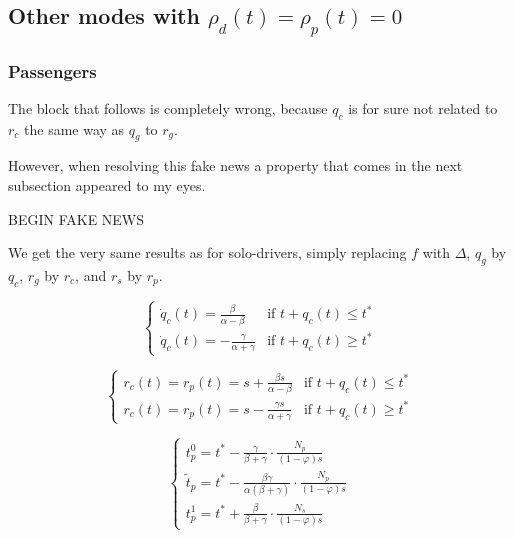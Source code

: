\documentclass[english, a4paper]{article}
\theoremstyle{plain}
\begin{document}
\subsection{Other modes with $\rho _{d}(t) = \rho _{p}(t) = 0$}

\subsubsection{Passengers}

The block that follows is completely wrong, because $q_c$ is for sure not related to $r_c$ the same way as $q_g$ to $r_g$.

However, when resolving this fake news a property that comes in the next subsection appeared to my eyes.

BEGIN FAKE NEWS

We get the very same results as for solo-drivers, simply replacing $f$ with $\Delta$, $q_g$ by $q_c$, $r_g$ by $r_c$, and $r_s$ by $r_p$.

\begin{equation}
    \left\{
    \begin{array}{lr}
        \dot{q}_c(t) = \frac{\beta}{\alpha - \beta} & \text{if } t+q_c(t) \leq t^*\\
        \dot{q}_c(t) = -\frac{\gamma}{\alpha + \gamma} & \text{if } t+q_c(t) \geq t^*  
    \end{array}
    \right.
\end{equation}

\begin{equation}
    \left\{
    \begin{array}{lr}
        r_c (t) = r_p(t) =s + \frac{\beta s}{\alpha - \beta} & \text{if } t + q_c(t) \leq t^*\\
        r_c (t) = r_p(t) =s - \frac{\gamma s}{\alpha + \gamma} & \text{if } t + q_c(t) \geq t^* 
    \end{array}
    \right.
\end{equation}

\begin{equation}
    \left\{
    \begin{array}{l}
        t_p^0 = t^* - \frac{\gamma}{\beta + \gamma} \cdot \frac{N_p}{(1-\varphi)s}\\
        \tilde{t}_p = t^* - \frac{\beta \gamma}{\alpha(\beta + \gamma)}\cdot \frac{N_p}{(1-\varphi)s}\\
        t_p^1 = t^* + \frac{\beta}{\beta + \gamma} \cdot \frac{N_s}{(1-\varphi)s}
    \end{array}
    \right.
\end{equation}
\end{document}
